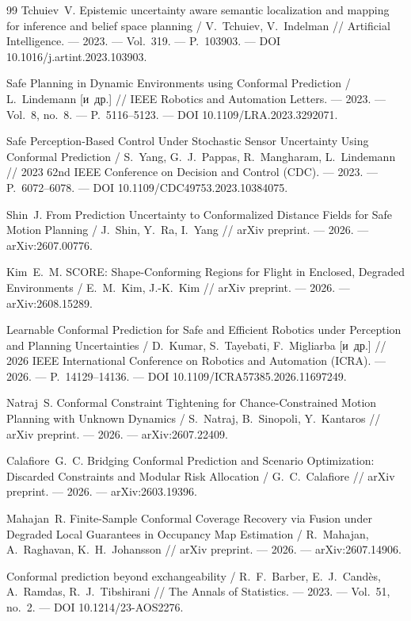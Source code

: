 \begin{thebibliography}{99}
 Tchuiev~V. Epistemic uncertainty aware semantic localization and mapping for inference and belief space planning / V.~Tchuiev, V.~Indelman // Artificial Intelligence. --- 2023. --- Vol.~319. --- P.~103903. --- DOI 10.1016/j.artint.2023.103903.

 Safe Planning in Dynamic Environments using Conformal Prediction / L.~Lindemann [и~др.] // IEEE Robotics and Automation Letters. --- 2023. --- Vol.~8, no.~8. --- P.~5116--5123. --- DOI 10.1109/LRA.2023.3292071.

 Safe Perception-Based Control Under Stochastic Sensor Uncertainty Using Conformal Prediction / S.~Yang, G.~J.~Pappas, R.~Mangharam, L.~Lindemann // 2023 62nd IEEE Conference on Decision and Control (CDC). --- 2023. --- P.~6072--6078. --- DOI 10.1109/CDC49753.2023.10384075.

 Shin~J. From Prediction Uncertainty to Conformalized Distance Fields for Safe Motion Planning / J.~Shin, Y.~Ra, I.~Yang // arXiv preprint. --- 2026. --- arXiv:2607.00776.

 Kim~E.~M. SCORE: Shape-Conforming Regions for Flight in Enclosed, Degraded Environments / E.~M.~Kim, J.-K.~Kim // arXiv preprint. --- 2026. --- arXiv:2608.15289.

 Learnable Conformal Prediction for Safe and Efficient Robotics under Perception and Planning Uncertainties / D.~Kumar, S.~Tayebati, F.~Migliarba [и~др.] // 2026 IEEE International Conference on Robotics and Automation (ICRA). --- 2026. --- P.~14129--14136. --- DOI 10.1109/ICRA57385.2026.11697249.

 Natraj~S. Conformal Constraint Tightening for Chance-Constrained Motion Planning with Unknown Dynamics / S.~Natraj, B.~Sinopoli, Y.~Kantaros // arXiv preprint. --- 2026. --- arXiv:2607.22409.

 Calafiore~G.~C. Bridging Conformal Prediction and Scenario Optimization: Discarded Constraints and Modular Risk Allocation / G.~C.~Calafiore // arXiv preprint. --- 2026. --- arXiv:2603.19396.

 Mahajan~R. Finite-Sample Conformal Coverage Recovery via Fusion under Degraded Local Guarantees in Occupancy Map Estimation / R.~Mahajan, A.~Raghavan, K.~H.~Johansson // arXiv preprint. --- 2026. --- arXiv:2607.14906.

 Conformal prediction beyond exchangeability / R.~F.~Barber, E.~J.~Cand\`es, A.~Ramdas, R.~J.~Tibshirani // The Annals of Statistics. --- 2023. --- Vol.~51, no.~2. --- DOI 10.1214/23-AOS2276.


\end{thebibliography}
